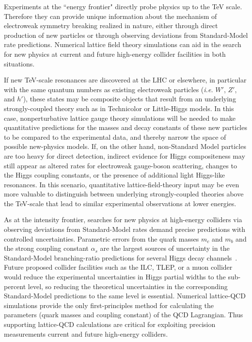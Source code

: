 Experiments at the ``energy frontier" directly probe physics up to the TeV scale.  Therefore they can provide unique information about the mechanism of electroweak symmetry breaking realized in nature, either through direct production of new particles or through observing deviations from Standard-Model rate predictions.   Numerical lattice field theory simulations can aid in the search for new physics at current and future high-energy collider facilities in both situations.   

If new TeV-scale resonances are discovered at the LHC or elsewhere, in particular with the same quantum numbers as existing electroweak particles ({\it i.e.} $W'$, $Z'$, and $h'$), these states may be composite objects that result from an underlying strongly-coupled theory such as in Technicolor or Little-Higgs models.   In this case, nonperturbative lattice gauge theory simulations will be needed to make quantitative predictions for the masses and decay constants of these new particles to be compared to the experimental data, and thereby narrow the space of possible new-physics models.  If, on the other hand, non-Standard Model particles are too heavy for direct detection, indirect evidence for Higgs compositeness may still appear as altered rates for electroweak gauge-boson scattering, changes to the Higgs coupling constants, or the presence of additional light Higgs-like resonances.  In this scenario, quantitative lattice-field-theory input may be even more valuable to distinguish between underlying strongly-coupled theories above the TeV-scale that lead to similar experimental observations at lower energies.  

As at the intensity frontier, searches for new physics at high-energy colliders via observing deviations from Standard-Model rates demand precise predictions with controlled uncertainties.  Parametric errors from the quark masses $m_c$ and $m_b$ and the strong coupling constant $\alpha_s$ are the largest sources of uncertainty in the Standard-Model branching-ratio predictions for several Higgs decay channels~\cite{Denner:2011mq}.  Future proposed collider facilities such as the ILC, TLEP, or a muon collider would reduce the experimental uncertainties in Higgs partial widths to the sub-percent level, so reducing the theoretical uncertainties in the corresponding Standard-Model predictions to the same level is essential.  Numerical lattice-QCD simulations provide the only first-principles method for calculating the parameters (quark masses and coupling constant) of the QCD Lagrangian.  Thus supporting lattice-QCD calculations are critical for exploiting precision measurements current and future high-energy colliders.

